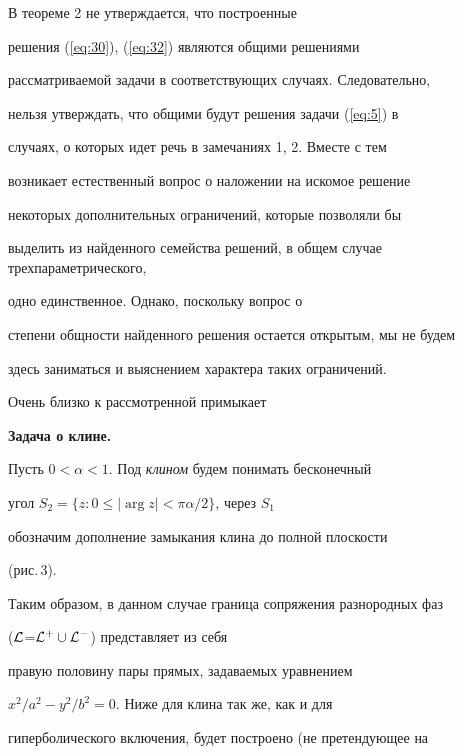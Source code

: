 \begin{note}


В теореме 2 не утверждается, что построенные


решения (\ref{eq:30}), (\ref{eq:32}) являются общими решениями


рассматриваемой задачи в соответствующих случаях. Следовательно,


нельзя утверждать, что общими будут решения задачи (\ref{eq:5}) в


случаях, о которых идет речь в замечаниях 1, 2. Вместе с тем


возникает естественный вопрос о наложении на искомое решение


некоторых дополнительных ограничений, которые позволяли бы


выделить из найденного семейства решений, в общем случае трехпараметрического,


одно единственное. Однако, поскольку вопрос о


степени общности найденного решения остается открытым, мы не будем


здесь заниматься и выяснением характера таких ограничений.


\end{note}





Очень близко к рассмотренной примыкает


\medskip





{\bf Задача о клине.}


Пусть $0<\alpha<1$. Под {\it клином} будем понимать бесконечный


угол $S_2=\{z:0\leq|\arg z|<\pi\alpha/2\}$, через $S_1$


обозначим дополнение замыкания клина до полной плоскости


(рис.\,3).





Таким образом, в данном случае граница сопряжения разнородных фаз


(${\cal L}$=${\cal L}^+\cup{\cal L}^-$) представляет из себя


правую половину пары прямых, задаваемых уравнением


$x^2/a^2-y^2/b^2=0$. Ниже для клина так же, как и для


гиперболического включения, будет построено (не претендующее на


